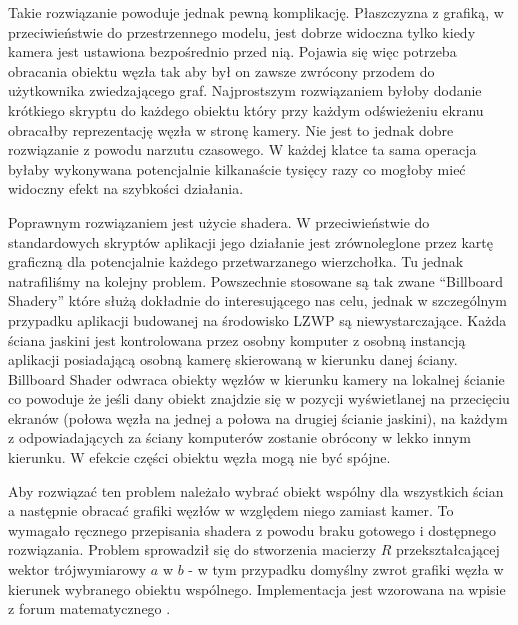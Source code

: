 
Takie rozwiązanie powoduje jednak pewną komplikację. Płaszczyzna z grafiką, w przeciwieństwie do przestrzennego modelu, jest dobrze widoczna tylko kiedy kamera jest ustawiona bezpośrednio przed nią. Pojawia się więc potrzeba obracania obiektu węzła tak aby był on zawsze zwrócony przodem do użytkownika zwiedzającego graf. Najprostszym rozwiązaniem byłoby dodanie krótkiego skryptu do każdego obiektu który przy każdym odświeżeniu ekranu obracałby reprezentację węzła w stronę kamery. Nie jest to jednak dobre rozwiązanie z powodu narzutu czasowego. W każdej klatce ta sama operacja byłaby wykonywana potencjalnie kilkanaście tysięcy razy co mogłoby mieć widoczny efekt na szybkości działania.

Poprawnym rozwiązaniem jest użycie shadera. W przeciwieństwie do standardowych skryptów aplikacji jego działanie jest zrównoleglone przez kartę graficzną dla potencjalnie każdego przetwarzanego wierzchołka. Tu jednak natrafiliśmy na kolejny problem. Powszechnie stosowane są tak zwane ``Billboard Shadery'' które służą dokładnie do interesującego nas celu, jednak w szczególnym przypadku aplikacji budowanej na środowisko LZWP są niewystarczające. Każda ściana jaskini jest kontrolowana przez osobny komputer z osobną instancją aplikacji posiadającą osobną kamerę skierowaną w kierunku danej ściany. Billboard Shader odwraca obiekty węzłów w kierunku kamery na lokalnej ścianie co powoduje że jeśli dany obiekt znajdzie się w pozycji wyświetlanej na przecięciu ekranów (połowa węzła na jednej a połowa na drugiej ścianie jaskini), na każdym z odpowiadających za ściany komputerów zostanie obrócony w lekko innym kierunku. W efekcie części obiektu węzła mogą nie być spójne.

Aby rozwiązać ten problem należało wybrać obiekt wspólny dla wszystkich ścian a następnie obracać grafiki węzłów w względem niego zamiast kamer. To wymagało ręcznego przepisania shadera z powodu braku gotowego i dostępnego rozwiązania. Problem sprowadził się do stworzenia macierzy \(R\) przekształcającej wektor trójwymiarowy \(a\) w \(b\) - w tym przypadku domyślny zwrot grafiki węzła w kierunek wybranego obiektu wspólnego. Implementacja jest wzorowana na wpisie z forum matematycznego \cite{BillboardShaderFormula}.

